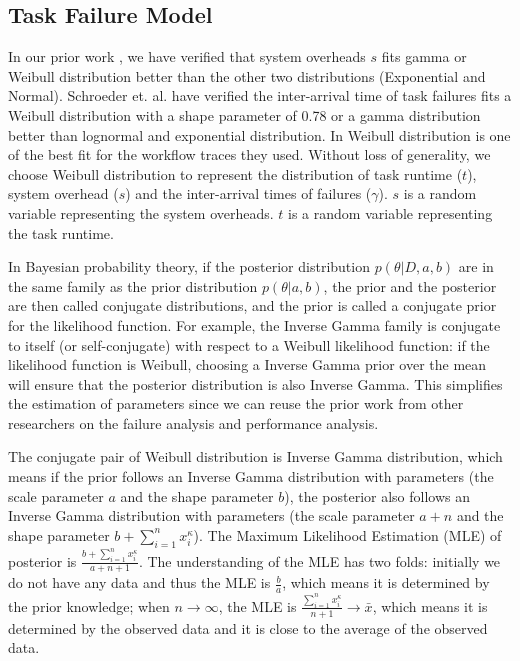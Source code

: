 \documentclass{IOS-Book-Article}
\begin{document}
\subsection{Task Failure Model}



In our prior work \cite{Chen2011}, we have verified that system overheads $s$ fits gamma or Weibull distribution better than the other two distributions (Exponential and Normal). Schroeder et. al. \cite{Schroeder2006} have verified the inter-arrival time of task failures fits a Weibull distribution with a shape parameter of 0.78 or a gamma distribution better than lognormal and exponential distribution. In \cite{Sun2003, Iosup2008} Weibull distribution is one of the best fit for the workflow traces they used.  Without loss of generality, we choose Weibull distribution to represent the distribution of task runtime ($t$), system overhead ($s$) and the inter-arrival times of failures ($\gamma$).  $s$ is a random variable representing the system overheads. $t$ is a random variable representing the task runtime. 

In Bayesian probability theory, if the posterior distribution $p(\theta|D, a, b)$ are in the same family as the prior distribution $p(\theta|a, b)$, the prior and the posterior are then called conjugate distributions, and the prior is called a conjugate prior for the likelihood function. For example, the Inverse Gamma family is conjugate to itself (or self-conjugate) with respect to a Weibull likelihood function: if the likelihood function is Weibull, choosing a Inverse Gamma prior over the mean will ensure that the posterior distribution is also Inverse Gamma. This simplifies the estimation of parameters since we can reuse the prior work from other researchers on the failure analysis and performance analysis. 

The conjugate pair of Weibull distribution is Inverse Gamma distribution, which means if the prior follows an Inverse Gamma distribution with parameters (the scale parameter $a$ and the shape parameter $b$), the posterior also follows an Inverse Gamma distribution with parameters (the scale parameter $a+n$ and the shape parameter $\displaystyle b+\sum_{i=1}^n{x_i^\kappa}$). The Maximum Likelihood Estimation  (MLE) of posterior is $\displaystyle\frac{b+\displaystyle\sum_{i=1}^n{x_i^\kappa}}{a+n+1}$. The understanding of the MLE has two folds: initially we do not have any data and thus the MLE is $\displaystyle\frac{b}{a}$, which means it is determined by the prior knowledge; when $n\to\infty$, the MLE is $\displaystyle\frac{\displaystyle\sum_{i=1}^n{x_i^\kappa}}{n+1}\to\bar{x}$, which means it is determined by the observed data and it is close to the average of the observed data. 
\end{document}
